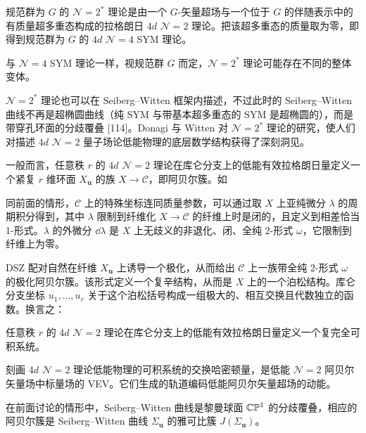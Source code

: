 \begin{definition}[20.34]
规范群为 $G$ 的 $\mathcal{N}=2^*$ 理论是由一个 $G$-矢量超场与一个位于 $G$ 的伴随表示中的有质量超多重态构成的拉格朗日 $4d$ $\mathcal{N}=2$ 理论。把该超多重态的质量取为零，即得到规范群为 $G$ 的 $4d$ $\mathcal{N}=4$ SYM 理论。
\end{definition}

\begin{remark}[20.35]
与 $\mathcal{N}=4$ SYM 理论一样，视规范群 $G$ 而定，$\mathcal{N}=2^*$ 理论可能存在不同的整体变体。
\end{remark}

$\mathcal{N}=2^*$ 理论也可以在 Seiberg–Witten 框架内描述，不过此时的 Seiberg–Witten 曲线不再是超椭圆曲线（纯 SYM 与带基本超多重态的 SYM 是超椭圆的），而是带穿孔环面的分歧覆叠 [114]。Donagi 与 Witten 对 $\mathcal{N}=2^*$ 理论的研究，使人们对描述 $4d$ $\mathcal{N}=2$ 量子场论低能物理的底层数学结构获得了深刻洞见。

\begin{proposition}[{{{{[114]}}}}]
一般而言，任意秩 $r$ 的 $4d$ $\mathcal{N}=2$ 理论在库仑分支上的低能有效拉格朗日量定义一个紧复 $r$ 维环面 $X_{\mathbf{u}}$ 的族 $X\to\mathcal{C}$，即阿贝尔簇。如

同前面的情形，$\mathcal{C}$ 上的特殊坐标连同质量参数，可以通过取 $X$ 上亚纯微分 $\lambda$ 的周期积分得到，其中 $\lambda$ 限制到纤维化 $X\to\mathcal{C}$ 的纤维上时是闭的，且定义到相差恰当 1-形式。$\lambda$ 的外微分 $\dd\lambda$ 是 $X$ 上无歧义的非退化、闭、全纯 2-形式 $\omega$，它限制到纤维上为零。
\end{proposition}

DSZ 配对自然在纤维 $X_{\mathbf{u}}$ 上诱导一个极化，从而给出 $\mathcal{C}$ 上一族带全纯 2-形式 $\omega$ 的极化阿贝尔簇。该形式定义一个复辛结构，从而是 $X$ 上的一个泊松结构。库仑分支坐标 $u_1,\dots,u_r$ 关于这个泊松括号构成一组极大的、相互交换且代数独立的函数。换言之：

\begin{proposition}[20.37]
任意秩 $r$ 的 $4d$ $\mathcal{N}=2$ 理论在库仑分支上的低能有效拉格朗日量定义一个复完全可积系统。
\end{proposition}

刻画 $4d$ $\mathcal{N}=2$ 理论低能物理的可积系统的交换哈密顿量，是低能 $\mathcal{N}=2$ 阿贝尔矢量场中标量场的 VEV。它们生成的轨道编码低能阿贝尔矢量超场的动能。

\begin{example}[20.38]
在前面讨论的情形中，Seiberg–Witten 曲线是黎曼球面 $\mathbb{C}\mathbb{P}^1$ 的分歧覆叠，相应的阿贝尔簇是 Seiberg–Witten 曲线 $\Sigma_{\mathbf{u}}$ 的雅可比簇 $J(\Sigma_{\mathbf{u}})$。
\end{example}

